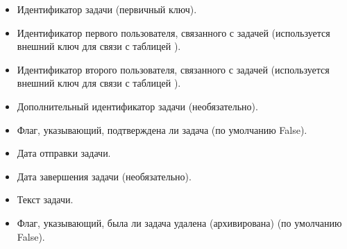 \documentclass[letterpaper,10pt,russian]{sphinxmanual}
\begin{document}
\sphinxAtStartPar
{}
\begin{itemize}
\item {} 
\sphinxAtStartPar
{} Идентификатор задачи (первичный ключ).

\item {} 
\sphinxAtStartPar
{}  Идентификатор первого пользователя, связанного с задачей (используется внешний ключ для связи с таблицей ).

\item {} 
\sphinxAtStartPar
{}  Идентификатор второго пользователя, связанного с задачей (используется внешний ключ для связи с таблицей ).

\item {} 
\sphinxAtStartPar
{}  Дополнительный идентификатор задачи (необязательно).

\item {} 
\sphinxAtStartPar
{}  Флаг, указывающий, подтверждена ли задача (по умолчанию False).

\item {} 
\sphinxAtStartPar
{}  Дата отправки задачи.

\item {} 
\sphinxAtStartPar
{}  Дата завершения задачи (необязательно).

\item {} 
\sphinxAtStartPar
{} Текст задачи.

\item {} 
\sphinxAtStartPar
{}  Флаг, указывающий, была ли задача удалена (архивирована) (по умолчанию False).

\end{itemize}
\end{document}

